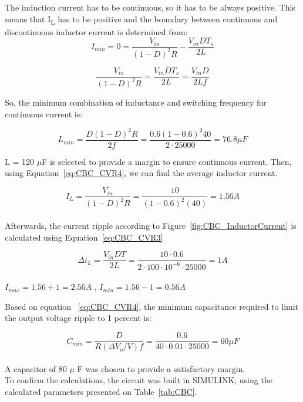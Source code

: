 The induction current has to be continuous, so it has to be always positive. This means that I\textsubscript{L} has to be positive and the boundary between continuous and discontinuous inductor current is determined from:\\
\begin{equation}
	I_{min} = 0 = \frac{V_{in}}{(1-D)^2R} - \frac{V_{in}DT_s}{2L}
\end{equation}

\begin{equation}
	\frac{V_{in}}{(1-D)^2R} = \frac{V_{in}DT_s}{2L} = \frac{V_{in}D}{2Lf}
\end{equation}


So, the minimum combination of inductance and switching frequency for continuous current is:

\begin{equation}
L_{min} = \frac{D(1-D)^2R}{2f} = \frac{0.6(1-0.6)^2 40}{2\cdot25000} = 76.8\mu F
\end{equation}


L = 120 $\mu$F is selected to provide a margin to ensure continuous current.
Then, using Equation~\ref{eq:CBC_CVR4}, we can find the average inductor current.

\begin{equation}
I_L = \frac{V_{in}}{(1-D)^2R} = \frac{10}{(1-0.6)^2(40)} = 1.56 A
\end{equation}\\
Afterwards, the current ripple according to Figure~\ref{fig:CBC_InductorCurrent} is calculated using Equation~\ref{eq:CBC_CVR3}

\begin{equation}
\Delta i_L = \frac{V_{in}DT}{2L} = \frac{10\cdot 0.6}{2\cdot 100\cdot 10^{-6}\cdot 25000} = 1 A
\end{equation}\\
$I_{max} = 1.56 + 1 = 2.56 A$ , 
$I_{min} = 1.56 - 1 = 0.56 A$


Based on equation ~\ref{eq:CBC_CVR4}, the minimum capacitance required to limit the output voltage ripple to 1 percent is:

\begin{equation}
C_{min} = \frac{D}{R(\Delta V_o/V)f} = \frac{0.6}{40\cdot 0.01\cdot 25000 } = 60\mu F
\end{equation}\\
A capacitor of 80 $\mu$ F was chosen to provide a satisfactory margin.\\

To confirm the calculations, the circuit was built in SIMULINK, using the calculated parameters presented on Table~\ref{tab:CBC}.

